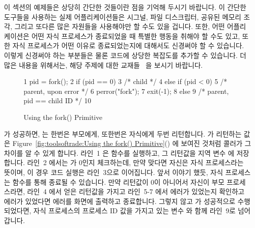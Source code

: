 이 섹션의 예제들은 상당히 간단한 것들이란 점을 기억해 두시기 바랍니다.
이 간단한 도구들을 사용하는 실제 어플리케이션들은 시그널, 파일 디스크립터,
공유된 메모리 조각, 그리고 또다른 많은 자원들을 사용해야만 할 수도 있을 겁니다.
또한, 어떤 어플리케이션은 어떤 자식 프로세스가 종료되었을 때 특별한 행동을
취해야 할 수도 있고, 또한 자식 프로세스가 어떤 이유로 종료되었는지에 대해서도
신경써야 할 수 있습니다.
이렇게 신경써야 하는 부분들은 물론 코드에 상당한 복잡도를 추가할 수 있습니다.
더 많은 내용을 위해서는, 해당 주제에 대한
교재들~\cite{WRichardStevens1992,StewartWeiss2013UNIX} 을 보시기 바랍니다.

\begin{figure}[tbp]
{ \scriptsize
\begin{verbbox}
  1 pid = fork();
  2 if (pid == 0) {
  3   /* child */
  4 } else if (pid < 0) {
  5   /* parent, upon error */
  6   perror("fork");
  7   exit(-1);
  8 } else {
  9   /* parent, pid == child ID */
 10 }
\end{verbbox}
}
\centering
\theverbbox
\caption{Using the fork() Primitive}
\label{fig:toolsoftrade:Using the fork() Primitive}
\end{figure}

 가 성공하면, 는 한번은 부모에게, 또한번은 자식에게 두번
리턴합니다.
 가 리턴하는 값은 Figure~\ref{fig:toolsoftrade:Using the fork()
Primitive}() 에 보여진 것처럼 콜러가 그 차이를 알 수 있게
합니다.
라인~1 은  함수를 실행하고, 그 리턴값을 지역 변수  에
저장합니다.
라인~2 에서는  가 0인지 체크하는데, 만약 맞다면 자신은 자식
프로세스라는 뜻이며, 이 경우 코드 실행은 라인~3으로 이어집니다.
앞서 이야기 했듯, 자식 프로세스는  함수를 통해 종료될 수 있습니다.
만약  리턴값이 0이 아니어서 자신이 부모 프로세스라면, 라인~4 에서
얻은  리턴값을 가지고 라인~5-7 에서 에러가 있었는지 확인하고 에러가
있었다면 에러를 화면에 출력하고 종료합니다.
그렇지 않고  가 성공적으로 수행되었다면, 자식 프로세스의 프로세스 ID
값을 가지고 있는 변수  와 함께 라인~9로 넘어갑니다.

